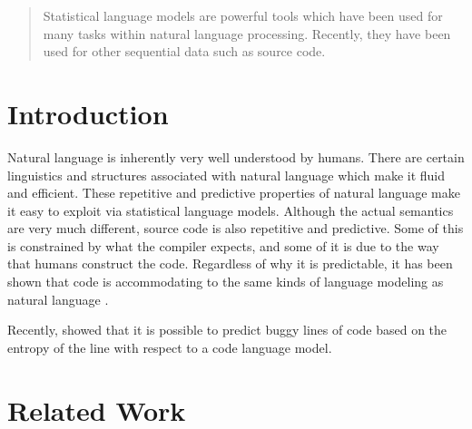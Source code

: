 \documentclass{article}
\begin{document}
 


\begin{abstract} 
Statistical language models are powerful tools which have been used for many tasks within natural language processing.
Recently, they have been used for other sequential data such as source code. \cite{ray2015naturalness} 
\end{abstract} 

\section{Introduction}
\label{introduction}
Natural language is inherently very well understood by humans. There are certain linguistics and structures associated with natural language which make it fluid and efficient. These repetitive and predictive properties of natural language make it easy to exploit via statistical language models. Although the actual semantics are very much different, source code is also repetitive and predictive. Some of this is constrained by what the compiler expects, and some of it is due to the way that humans construct the code. Regardless of why it is predictable, it has been shown that code is accommodating to the same kinds of language modeling as natural language  \citep{hindle2012naturalness}. 


Recently, \cite{ray2015naturalness} showed that it is possible to predict buggy lines of code based on the entropy of the line with respect to a code language model. 


\section{Related Work}
\end{document}
